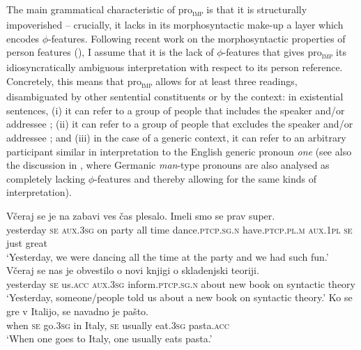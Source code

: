 \documentclass[output=paper,
modfonts,nonflat,
newtxmath
]{langsci/langscibook}
\begin{document}
The main grammatical characteristic of pro\textsubscript{\textsc{imp}} is that it is structurally impoverished -- crucially, it lacks in its morphosyntactic make-up a layer which encodes $\phi$-features. Following recent work on the morphosyntactic properties of person features (\citealt{ackema2013,ackema2018}), I assume that it is the lack of $\phi$-features that gives pro\textsubscript{\textsc{imp}} its idiosyncratically ambiguous interpretation with respect to its person reference. Concretely, this means that pro\textsubscript{\textsc{imp}} allows for at least  three readings, disambiguated by other sentential constituents or by the context: in existential sentences, (i) it can refer to a group of people that includes the speaker and/or addressee ; (ii) it can refer to a group of people that excludes the speaker and/or addressee ; and (iii) in the case of a generic context, it can refer to an arbitrary participant similar in interpretation to the English generic pronoun \textit{one}  (see also the discussion in \citealt{Fenger2017}, where Germanic \textit{man}-type pronouns are also analysed as completely lacking $\phi$-features and thereby allowing for the same kinds of interpretation). \par
\largerpage[2]


\begin{exe}
\ex \label{ex:lenardic: 20} \gll Včeraj se je na zabavi ves čas plesalo. Imeli smo se prav super.\\
yesterday \textsc{se} \textsc{aux}.\textsc{3sg} on party all time dance.\textsc{ptcp.sg.n} have.\textsc{ptcp.pl.m} \textsc{aux}.\textsc{1pl} \textsc{se} just great\\
\trans `Yesterday, we were dancing all the time at the party and we had such fun.'
\ex \label{ex:lenardic: 21} \gll Včeraj se nas je obvestilo o novi knjigi o skladenjski teoriji.\\
yesterday \textsc{se} us.\textsc{acc} \textsc{aux}.\textsc{3sg} inform.\textsc{ptcp.sg.n} about new book on syntactic theory\\
\trans `Yesterday, someone/people told us about a new book on syntactic theory.'
\ex \label{ex:lenardic: 22} \gll Ko se gre v Italijo, se navadno je pašto.\\
when \textsc{se} go.\textsc{3sg} in Italy, \textsc{se} usually eat.\textsc{3sg} pasta.\textsc{acc}\\
\trans `When one goes to Italy, one usually eats pasta.'
\end{exe} \par
 
\end{document}
